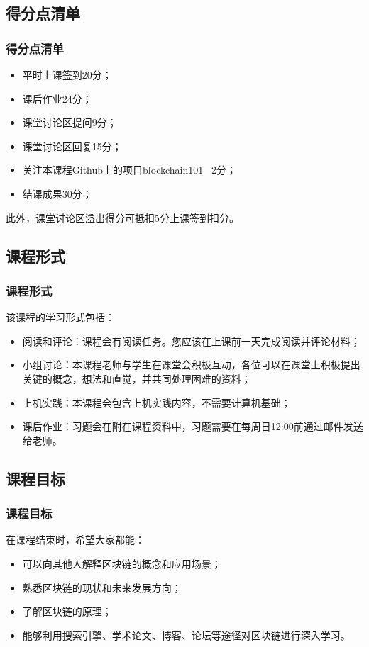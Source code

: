 \documentclass[11pt]{beamer}
\begin{document}
	\subsection{得分点清单}
	\begin{frame}
	\frametitle{得分点清单}
	\begin{itemize}
		\item 平时上课签到20分；
		\item 课后作业24分；
		\item 课堂讨论区提问9分；
		\item 课堂讨论区回复15分；
		\item 关注本课程Github上的项目blockchain101 \ 2分；
		\item 结课成果30分；
	\end{itemize}
此外，课堂讨论区溢出得分可抵扣5分上课签到扣分。
	\end{frame}

	\subsection{课程形式}
	\begin{frame}
	\frametitle{课程形式}
	该课程的学习形式包括：
	\begin{itemize}
		\item 阅读和评论：课程会有阅读任务。您应该在上课前一天完成阅读并评论材料；
		\item 小组讨论：本课程老师与学生在课堂会积极互动，各位可以在课堂上积极提出关键的概念，想法和直觉，并共同处理困难的资料；
		\item 上机实践：本课程会包含上机实践内容，不需要计算机基础；
		\item 课后作业：习题会在附在课程资料中，习题需要在每周日12:00前通过邮件发送给老师。
	\end{itemize}
	\end{frame}

	\subsection{课程目标}
	\begin{frame}
	\frametitle{课程目标}
	在课程结束时，希望大家都能：
	\begin{itemize}
		\item 可以向其他人解释区块链的概念和应用场景；
		\item 熟悉区块链的现状和未来发展方向；
		\item 了解区块链的原理；
		\item 能够利用搜索引擎、学术论文、博客、论坛等途径对区块链进行深入学习。
	\end{itemize}
	\end{frame}
\end{document}
